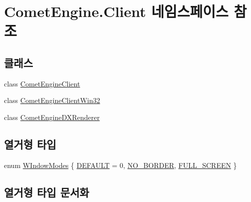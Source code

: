\hypertarget{namespace_comet_engine_1_1_client}{}\section{Comet\+Engine.\+Client 네임스페이스 참조}
\label{namespace_comet_engine_1_1_client}
\subsection*{클래스}
\begin{DoxyCompactItemize}
\item 
class \hyperlink{class_comet_engine_1_1_client_1_1_comet_engine_client}{Comet\+Engine\+Client}
\item 
class \hyperlink{class_comet_engine_1_1_client_1_1_comet_engine_client_win32}{Comet\+Engine\+Client\+Win32}
\item 
class \hyperlink{class_comet_engine_1_1_client_1_1_comet_engine_d_x_renderer}{Comet\+Engine\+D\+X\+Renderer}
\end{DoxyCompactItemize}
\subsection*{열거형 타입}
\begin{DoxyCompactItemize}
\item 
enum \hyperlink{namespace_comet_engine_1_1_client_a608d2e459fd95babca189e50f4182a65}{W\+Indow\+Modes} \{ \hyperlink{namespace_comet_engine_1_1_client_a608d2e459fd95babca189e50f4182a65a5b39c8b553c821e7cddc6da64b5bd2ee}{D\+E\+F\+A\+U\+LT} = 0, 
\hyperlink{namespace_comet_engine_1_1_client_a608d2e459fd95babca189e50f4182a65a2f015b4197d85c9acc95af0642e1ca1a}{N\+O\+\_\+\+B\+O\+R\+D\+ER}, 
\hyperlink{namespace_comet_engine_1_1_client_a608d2e459fd95babca189e50f4182a65ae1a502139199d41bcd8f603a6d579b70}{F\+U\+L\+L\+\_\+\+S\+C\+R\+E\+EN}
 \}
\end{DoxyCompactItemize}


\subsection{열거형 타입 문서화}
\mbox{\label{namespace_comet_engine_1_1_client_a608d2e459fd95babca189e50f4182a65}} 
